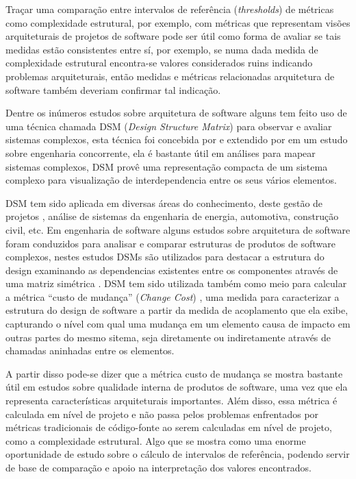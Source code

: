 Traçar uma comparação entre intervalos de referência ({\it thresholds}) de
métricas como complexidade estrutural, por exemplo, com métricas que
representam visões arquiteturais de projetos de software pode ser útil como
forma de avaliar se tais medidas estão consistentes entre sí, por exemplo, se
numa dada medida de complexidade estrutural encontra-se valores considerados
ruins indicando problemas arquiteturais, então medidas e métricas relacionadas
arquitetura de software também deveriam confirmar tal indicação.

Dentre os inúmeros estudos sobre arquitetura de software alguns tem feito uso
de uma técnica chamada DSM ({\it Design Structure Matrix}) para observar e
avaliar sistemas complexos, esta técnica foi concebida por
 e extendido por  em um estudo
sobre engenharia concorrente, ela é bastante útil em análises para mapear
sistemas complexos, DSM provê uma representação compacta de um sistema complexo
para visualização de interdependencia entre os seus vários elementos.

DSM tem sido aplicada em diversas áreas do conhecimento, deste gestão de
projetos \cite{Browning2016}, análise de sistemas da engenharia de energia,
automotiva, construção civil, etc. Em engenharia de software alguns estudos
sobre arquitetura de software foram conduzidos para analisar e comparar
estruturas de produtos de software complexos, nestes estudos DSMs são
utilizados para destacar a estrutura do design examinando as dependencias
existentes entre os componentes através de uma matriz simétrica
\cite{Steward1981}. DSM tem sido utilizada também como meio para calcular a
métrica ``custo de mudança'' ({\it Change Cost}) \cite{Maccormack2006},
uma medida para caracterizar a estrutura do design de software a partir da
medida de acoplamento que ela exibe, capturando o nível com qual uma mudança em
um elemento causa de impacto em outras partes do mesmo sitema, seja diretamente
ou indiretamente através de chamadas aninhadas entre os elementos.

A partir disso pode-se dizer que a métrica custo de mudança se mostra bastante
útil em estudos sobre qualidade interna de produtos de software, uma vez que
ela representa características arquiteturais importantes. Além disso, essa
métrica é calculada em nível de projeto e não passa pelos problemas enfrentados
por métricas tradicionais de código-fonte ao serem calculadas em nível de
projeto, como a complexidade estrutural.  Algo que se mostra como uma enorme
oportunidade de estudo sobre o cálculo de intervalos de referência, podendo
servir de base de comparação e apoio na interpretação dos valores encontrados.


